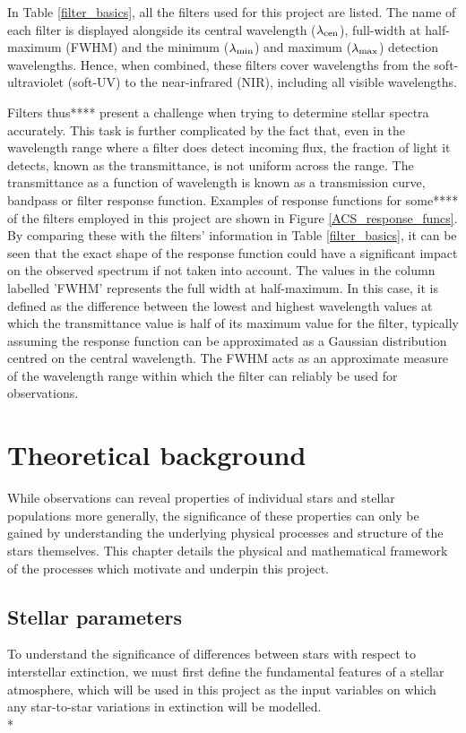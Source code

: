 \documentclass[12pt, a4paper]{report}
\begin{document}
In Table \ref{filter_basics}, all the filters used for this project are listed. The name of each filter is displayed alongside its central wavelength ($\lambda_{\textnormal{cen}}$), full-width at half-maximum (FWHM) and the minimum ($\lambda_{\textnormal{min}}$) and maximum ($\lambda_{\textnormal{max}}$) detection wavelengths. Hence, when combined, these filters cover wavelengths from the soft-ultraviolet (soft-UV) to the near-infrared (NIR),  including all visible wavelengths.

Filters thus**** present a challenge when trying to determine stellar spectra accurately. This task is further complicated by the fact that, even in the wavelength range where a filter does detect incoming flux, the fraction of light it detects, known as the transmittance, is not uniform across the range. The transmittance as a function of wavelength is known as a transmission curve, bandpass or filter response function. Examples of response functions for some**** of the filters employed in this project are shown in Figure \ref{ACS_response_funcs}. By comparing these with the filters' information in Table \ref{filter_basics}, it can be seen that the exact shape of the response function could have a significant impact on the observed spectrum if not taken into account.
The values in the column labelled 'FWHM' represents the full width at half-maximum. In this case, it is defined as the difference between the lowest and highest wavelength values at which the transmittance value is half of its maximum value for the filter, typically assuming the response function can be approximated as a Gaussian distribution centred on the central wavelength. The FWHM acts as an approximate measure of the wavelength range within which the filter can reliably be used for observations.



\chapter{Theoretical background}
While observations can reveal properties of individual stars and stellar populations more generally, the significance of these properties can only be gained by understanding the underlying physical processes and structure of the stars themselves. This chapter details the physical and mathematical framework of the processes which motivate and underpin this project.

\section{Stellar parameters} \label{params}
To understand the significance of differences between stars with respect to interstellar extinction, we must first define the fundamental features of a stellar atmosphere, which will be used in this project as the input variables on which any star-to-star variations in extinction will be modelled. \\*
\end{document}
